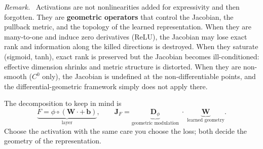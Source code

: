 \documentclass[11pt,a4paper]{article}
\theoremstyle{remark}
\newenvironment{keyresult}{\par\medskip\noindent\textit{Remark.}\ }{\par\medskip}
\begin{document}
\begin{keyresult}
Activations are not nonlinearities added for expressivity and then forgotten.
They are \textbf{geometric operators} that control the Jacobian, the pullback metric, and the topology of the learned representation.
When they are many-to-one and induce zero derivatives (ReLU), the Jacobian may lose exact rank and information along the killed directions is destroyed.
When they saturate (sigmoid, tanh), exact rank is preserved but the Jacobian becomes ill-conditioned: effective dimension shrinks and metric structure is distorted.
When they are non-smooth ($C^0$ only), the Jacobian is undefined at the non-differentiable points, and the differential-geometric framework simply does not apply there.

The decomposition to keep in mind is
\[
  \underbrace{F = \phi \circ (\mathbf{W} \cdot {+}\, \mathbf{b})}_{\text{layer}}, \qquad
  \mathbf{J}_F = \underbrace{\mathbf{D}_\phi}_{\text{geometric modulation}} \;\cdot\; \underbrace{\mathbf{W}}_{\text{learned geometry}}.
\]
Choose the activation with the same care you choose the loss; both decide the geometry of the representation.
\end{keyresult}
\end{document}
